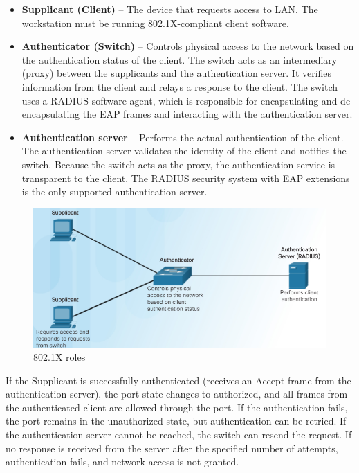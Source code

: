 \begin{itemize}
\item \textbf{Supplicant (Client)} -- The device that requests access to LAN. The workstation must be running 802.1X-compliant client software. 
\item \textbf{Authenticator (Switch)} -- Controls physical access to the network based on the authentication status of the client. The switch acts as an intermediary (proxy) between the supplicants and the authentication server. It verifies information from the client and relays a response to the client. The switch uses a RADIUS software agent, which is responsible for encapsulating and de-encapsulating the EAP frames and interacting with the authentication server.
\item \textbf{Authentication server} -- Performs the actual authentication of the client. The authentication server validates the identity of the client and notifies the switch. Because the switch acts as the proxy, the authentication service is transparent to the client. The RADIUS security system with EAP extensions is the only supported authentication server.
\end{itemize}

\begin{figure}[hbtp]
\caption{802.1X roles}\label{802.1X}
\centering
\includegraphics[scale=0.5]{pictures/8021X.PNG}
\end{figure}

If the Supplicant is successfully authenticated (receives an Accept frame from the authentication server), the port state changes to authorized, and all frames from the authenticated client are allowed through the port. If the authentication fails, the port remains in the unauthorized state, but authentication can be retried. If the authentication server cannot be reached, the switch can resend the request. If no response is received from the server after the specified number of attempts, authentication fails, and network access is not granted.

